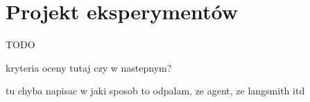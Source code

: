 \clearpage %
\section{Projekt eksperymentów}

TODO

kryteria oceny tutaj czy w nastepnym?

tu chyba napisac w jaki sposob to odpalam, ze agent, ze langsmith itd